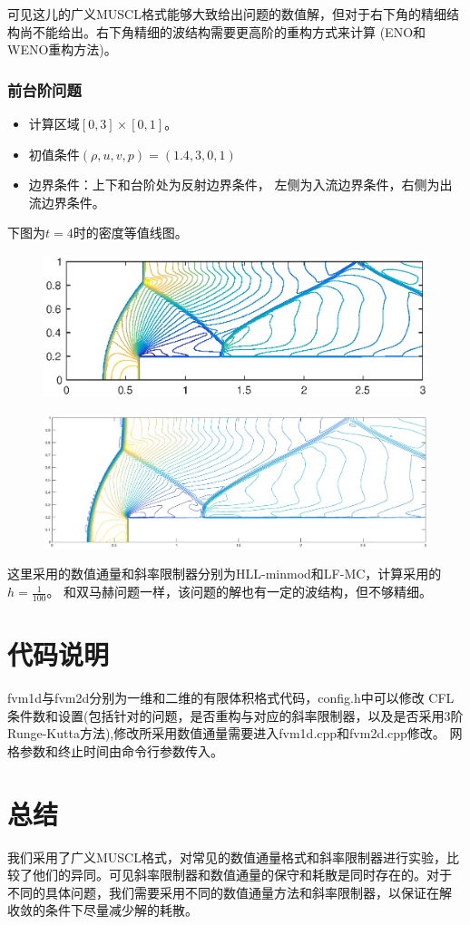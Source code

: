 \documentclass[a4paper,  11pt]{ctexart}
\begin{document}
可见这儿的广义MUSCL格式能够大致给出问题的数值解，但对于右下角的精细结
构尚不能给出。右下角精细的波结构需要更高阶的重构方式来计算
(ENO和WENO重构方法)。 
\subsubsection{前台阶问题}
\begin{itemize}
  \item 计算区域$[0,3]\times[0,1]$。
  \item 初值条件$(\rho,u,v,p)=(1.4,3,0,1)$
  \item 边界条件：上下和台阶处为反射边界条件，
    左侧为入流边界条件，右侧为出流边界条件。
\end{itemize}
下图为$t=4$时的密度等值线图。
\begin{figure}[H]
  \begin{center}
    \includegraphics[width=\textwidth]{./images/ForwardStep-300-100-HLL-minmod.eps}
  \end{center}
\end{figure}
\vspace{-4cm}
\begin{figure}[H]
  \begin{center}
    \includegraphics[width=\textwidth]{./images/ForwardStep-300-100-LF-MC.eps}
  \end{center}
\end{figure}
这里采用的数值通量和斜率限制器分别为HLL-minmod和LF-MC，计算采用的
$h=\frac{1}{100}$。
和双马赫问题一样，该问题的解也有一定的波结构，但不够精细。

\section{代码说明}
fvm1d与fvm2d分别为一维和二维的有限体积格式代码，config.h中可以修改
CFL条件数和设置(包括针对的问题，是否重构与对应的斜率限制器，以及是否采用3阶
Runge-Kutta方法),修改所采用数值通量需要进入fvm1d.cpp和fvm2d.cpp修改。
网格参数和终止时间由命令行参数传入。
\section{总结}
我们采用了广义MUSCL格式，对常见的数值通量格式和斜率限制器进行实验，比
较了他们的异同。可见斜率限制器和数值通量的保守和耗散是同时存在的。对于
不同的具体问题，我们需要采用不同的数值通量方法和斜率限制器，以保证在解
收敛的条件下尽量减少解的耗散。
\end{document}
